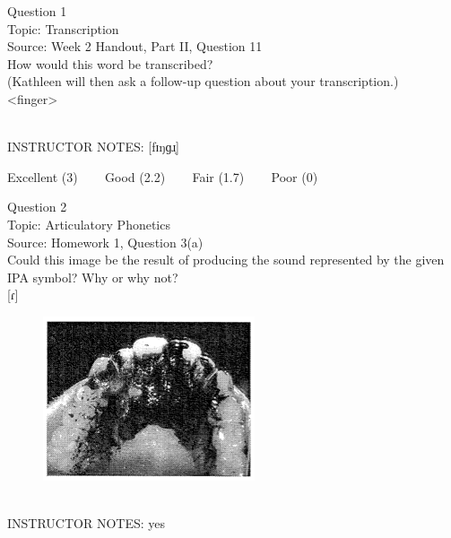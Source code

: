 \documentclass[12pt]{article}
\begin{document}
\begin{center}
\textbf{{\color{blue}{\HUGE START OF EXAM\\}}}

\textbf{{\color{blue}{\HUGE Student ID: 59669\\}}}

\textbf{{\color{blue}{\HUGE \\}}}

\end{center}
\newpage

{\large Question 1}\\

Topic: Transcription\\
Source: Week 2 Handout, Part II, Question 11\\

How would this word be transcribed?\\ (Kathleen will then ask a follow-up question about your transcription.)\\

<finger>


~\\
INSTRUCTOR NOTES: [fɪŋɡɹ̩]


\vfill
Excellent (3) ~~~ Good (2.2) ~~~ Fair (1.7) ~~~ Poor (0)
\newpage

{\large Question 2}\\

Topic: Articulatory Phonetics\\
Source: Homework 1, Question 3(a)\\

Could this image be the result of producing the sound represented by the given IPA symbol? Why or why not?\\

{[ɾ]}

\begin{figure}[H]
\includegraphics{../images/staticpalatography_stop.png}
\end{figure}

~\\
INSTRUCTOR NOTES: yes
\end{document}
